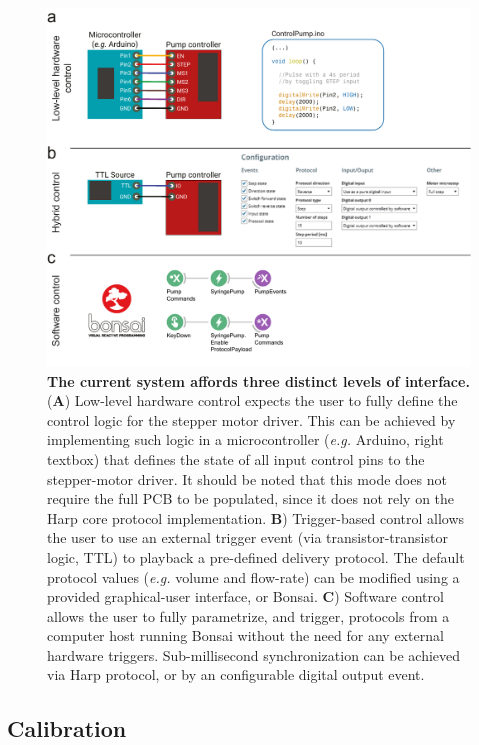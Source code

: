\begin{itemize}
\begin{figure}
	\centering
	\includegraphics[width=1.0\linewidth]{Figures/Artboard 4.pdf}
	\caption{\textbf{The current system affords three distinct levels of interface.}\\
		(\textbf{A}) Low-level hardware control expects the user to fully define the control logic for the stepper motor driver. This can be achieved by implementing such logic in a microcontroller (\textit{e.g.} Arduino, right textbox) that defines the state of all input control pins to the stepper-motor driver. It should be noted that this mode does not require the full PCB to be populated, since it does not rely on the Harp core protocol implementation. \textbf{B}) Trigger-based control allows the user to use an external trigger event (via transistor-transistor logic, TTL) to playback a pre-defined delivery protocol. The default protocol values (\textit{e.g.} volume and flow-rate) can be modified using a provided graphical-user interface, or Bonsai. \textbf{C}) Software control allows the user to fully parametrize, and trigger, protocols from a computer host running Bonsai without the need for any external hardware triggers. Sub-millisecond synchronization can be achieved via Harp protocol, or by an configurable digital output event.}
	\label{fig:PumpControl} 
\end{figure}

\end{itemize}

\subsection*{Calibration}
